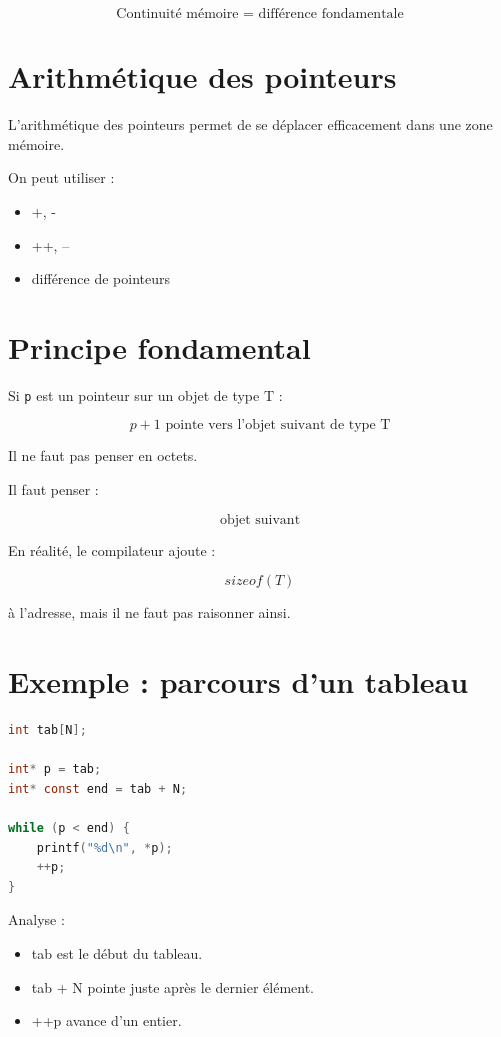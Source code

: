 \[
\boxed{
\text{Continuité mémoire = différence fondamentale}
}
\]

\section{Arithmétique des pointeurs}

L’arithmétique des pointeurs permet de se déplacer efficacement
dans une zone mémoire.

On peut utiliser :

\begin{itemize}
\item +, -
\item ++, --
\item différence de pointeurs
\end{itemize}

\section{Principe fondamental}

Si \texttt{p} est un pointeur sur un objet de type T :

\[
\boxed{
p + 1 \text{ pointe vers l’objet suivant de type T}
}
\]

Il ne faut pas penser en octets.

Il faut penser :

\[
\text{objet suivant}
\]

En réalité, le compilateur ajoute :

\[
sizeof(T)
\]

à l’adresse, mais il ne faut pas raisonner ainsi.

\section{Exemple : parcours d’un tableau}

\begin{lstlisting}[language=C]
int tab[N];

int* p = tab;
int* const end = tab + N;

while (p < end) {
    printf("%d\n", *p);
    ++p;
}
\end{lstlisting}

Analyse :

\begin{itemize}
\item tab est le début du tableau.
\item tab + N pointe juste après le dernier élément.
\item ++p avance d’un entier.
\end{itemize}


